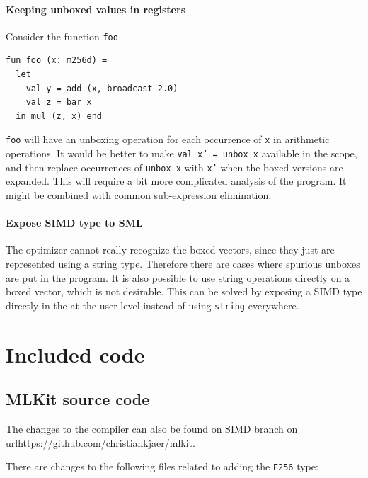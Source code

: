 \documentclass{article}
\begin{document}
\paragraph{Keeping unboxed values in registers}
Consider the function \texttt{foo}
\begin{verbatim}
fun foo (x: m256d) =
  let
    val y = add (x, broadcast 2.0)
    val z = bar x
  in mul (z, x) end
\end{verbatim}
\texttt{foo} will have an unboxing operation for each occurrence of \texttt{x} in arithmetic operations. It would be better to make \texttt{val x' = unbox x} available in the scope, and then replace occurrences of \texttt{unbox x} with \texttt{x'} when the boxed versions are expanded. This will require a bit more complicated analysis of the program. It might be combined with common sub-expression elimination.

\paragraph{Expose SIMD type to SML}

The optimizer cannot really recognize the boxed vectors, since they just are represented using a string type. Therefore there are cases where spurious unboxes are put in the program. It is also possible to use string operations directly on a boxed vector, which is not desirable. This can be solved by exposing a SIMD type directly in the at the user level instead of using \verb!string! everywhere.




\appendix

\section{Included code}

\subsection{MLKit source code}

The changes to the compiler can also be found on SIMD branch on url{https://github.com/christiankjaer/mlkit}.

There are changes to the following files related to adding the \verb!F256! type:
\end{document}
